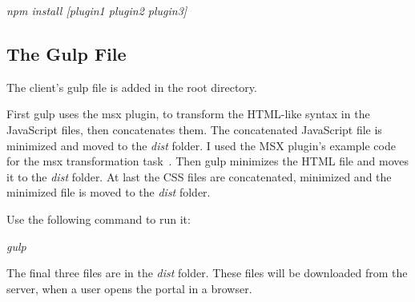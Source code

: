 \emph{npm install [plugin1 plugin2 plugin3]}

\subsection{The Gulp File}
The client's gulp file is added in the root directory. 

First gulp uses the msx plugin, to transform the HTML-like syntax in the JavaScript files, then concatenates them. The concatenated JavaScript file is minimized and moved to the \emph{dist} folder. I used the MSX plugin's example code for the msx transformation task~\cite{gulp-msx-example}. Then gulp minimizes the HTML file and moves it to the \emph{dist} folder. At last the CSS files are concatenated, minimized and the minimized file is moved to the \emph{dist} folder.

Use the following command to run it:

\emph{gulp}

The final three files are in the \emph{dist} folder. These files will be downloaded from the server, when a user opens the portal in a browser.
